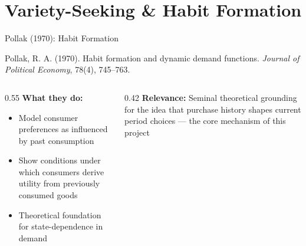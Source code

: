 \documentclass[aspectratio=169,professionalfonts]{beamer}
\newcommand{\hl}[1]{\textbf{\textcolor{UGARed}{#1}}}
\begin{document}
\section{Variety-Seeking \& Habit Formation}

\begin{frame}{Pollak (1970): Habit Formation}
  \begin{tcolorbox}[colback=red!5!white, colframe=UGARed, title=\textbf{Citation}]
    Pollak, R. A. (1970). Habit formation and dynamic demand functions.
    \textit{Journal of Political Economy}, 78(4), 745--763.
  \end{tcolorbox}
  \vspace{6pt}
  \begin{columns}[T]
    \begin{column}{0.55\textwidth}
      \hl{What they do:}
      \begin{itemize}
        \item Model consumer preferences as influenced by past consumption
        \item Show conditions under which consumers derive utility from previously consumed goods
        \item Theoretical foundation for state-dependence in demand
      \end{itemize}
    \end{column}
    \begin{column}{0.42\textwidth}
      \hl{Relevance:} Seminal theoretical grounding for the idea that purchase history
      shapes current period choices --- the core mechanism of this project
    \end{column}
  \end{columns}
\end{frame}
\end{document}

